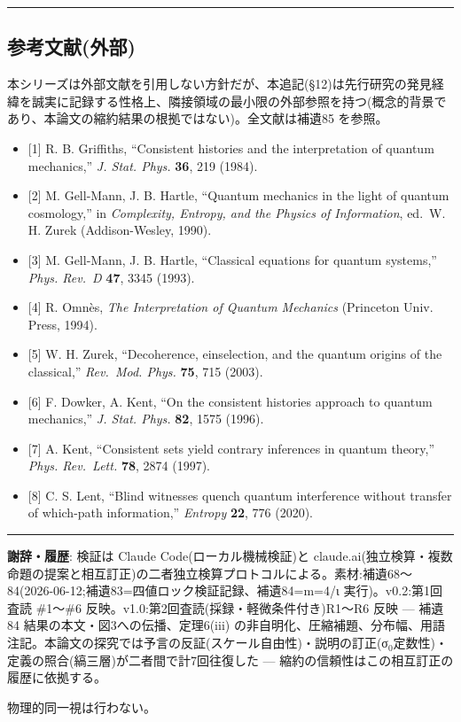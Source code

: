 \documentclass[
]{ltjsarticle}
\providecommand{\tightlist}{%
  \setlength{\itemsep}{0pt}\setlength{\parskip}{0pt}}
\begin{document}
\begin{center}\rule{0.5\linewidth}{0.5pt}\end{center}

\subsection{参考文献(外部)}\label{ux53c2ux8003ux6587ux732eux5916ux90e8}

本シリーズは外部文献を引用しない方針だが、本追記(§12)は先行研究の発見経緯を誠実に記録する性格上、隣接領域の最小限の外部参照を持つ(概念的背景であり、本論文の縮約結果の根拠ではない)。全文献は補遺85
を参照。

\begin{itemize}
\tightlist
\item
  {[}1{]} R. B. Griffiths, ``Consistent histories and the interpretation
  of quantum mechanics,'' \emph{J. Stat. Phys.} \textbf{36}, 219 (1984).
\item
  {[}2{]} M. Gell-Mann, J. B. Hartle, ``Quantum mechanics in the light
  of quantum cosmology,'' in \emph{Complexity, Entropy, and the Physics
  of Information}, ed.~W. H. Zurek (Addison-Wesley, 1990).
\item
  {[}3{]} M. Gell-Mann, J. B. Hartle, ``Classical equations for quantum
  systems,'' \emph{Phys. Rev.~D} \textbf{47}, 3345 (1993).
\item
  {[}4{]} R. Omnès, \emph{The Interpretation of Quantum Mechanics}
  (Princeton Univ. Press, 1994).
\item
  {[}5{]} W. H. Zurek, ``Decoherence, einselection, and the quantum
  origins of the classical,'' \emph{Rev.~Mod. Phys.} \textbf{75}, 715
  (2003).
\item
  {[}6{]} F. Dowker, A. Kent, ``On the consistent histories approach to
  quantum mechanics,'' \emph{J. Stat. Phys.} \textbf{82}, 1575 (1996).
\item
  {[}7{]} A. Kent, ``Consistent sets yield contrary inferences in
  quantum theory,'' \emph{Phys. Rev.~Lett.} \textbf{78}, 2874 (1997).
\item
  {[}8{]} C. S. Lent, ``Blind witnesses quench quantum interference
  without transfer of which-path information,'' \emph{Entropy}
  \textbf{22}, 776 (2020).
\end{itemize}

\begin{center}\rule{0.5\linewidth}{0.5pt}\end{center}

\textbf{謝辞・履歴}: 検証は Claude Code(ローカル機械検証)と
claude.ai(独立検算・複数命題の提案と相互訂正)の二者独立検算プロトコルによる。素材:補遺68〜84(2026-06-12;補遺83=四値ロック検証記録、補遺84=m=4/ι
実行)。v0.2:第1回査読 \#1〜\#6
反映。v1.0:第2回査読(採録・軽微条件付き)R1〜R6 反映 --- 補遺84
結果の本文・図3への伝播、定理6(iii)
の非自明化、圧縮補題、分布幅、用語注記。本論文の探究では予言の反証(スケール自由性)・説明の訂正(σ\(_{0}\)定数性)・定義の照合(縞三層)が二者間で計7回往復した
--- 縮約の信頼性はこの相互訂正の履歴に依拠する。

物理的同一視は行わない。
\end{document}
